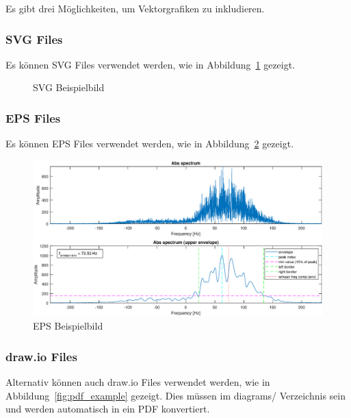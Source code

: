 \documentclass[11pt,a4paper,hidelinks]{article}
\begin{document}
Es gibt drei Möglichkeiten, um Vektorgrafiken zu inkludieren.

\subsubsection{SVG Files}\label{sec:svg_files}

Es können SVG Files verwendet werden, wie in Abbildung~\ref{fig:svg_example} gezeigt.

\begin{figure}[H]
    \centering
    
    \caption[SVG Beispielbild]{SVG Beispielbild}\label{fig:svg_example}
\end{figure}

\subsubsection{EPS Files}\label{sec:eps_files}

Es können EPS Files verwendet werden, wie in Abbildung~\ref{fig:eps_example} gezeigt.

\begin{figure}[H]
    \centering
    \includegraphics[width=\textwidth]{graphics/eps_example.eps}
    \caption[EPS Beispielbild]{EPS Beispielbild}\label{fig:eps_example}
\end{figure}

\subsubsection{draw.io Files}\label{sec:drawio_files}

Alternativ können auch draw.io Files verwendet werden, wie in Abbildung~\ref{fig:pdf_example} gezeigt. Dies müssen im diagrams/ Verzeichnis sein und werden automatisch in ein PDF konvertiert.
\end{document}
